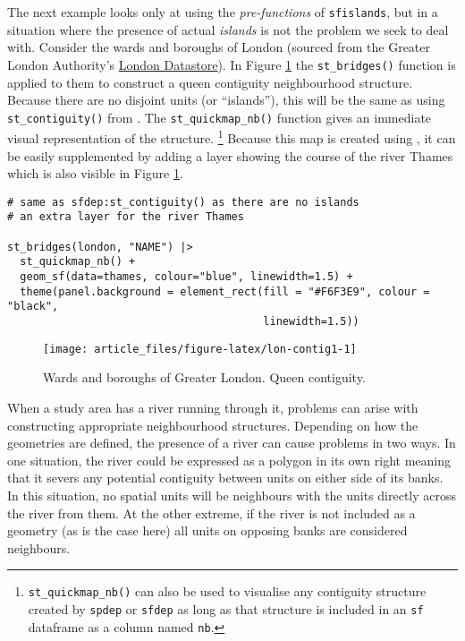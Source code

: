 The next example looks only at using the \emph{pre-functions} of \texttt{sfislands}, but in a situation where the presence of actual \emph{islands} is not the problem we seek to deal with. Consider the wards and boroughs of London (sourced from the Greater London Authority's \href{https://data.london.gov.uk/}{London Datastore}). In Figure \ref{fig:lon-contig1} the \texttt{st\_bridges()}
function is applied to them to construct a queen contiguity
neighbourhood structure. Because there are no disjoint units (or
``islands''), this will be the same as using \texttt{st\_contiguity()} from
. The \texttt{st\_quickmap\_nb()} function gives an immediate
visual representation of the structure. \footnote{\texttt{st\_quickmap\_nb()} can also be used to visualise any contiguity structure created by \texttt{spdep} or \texttt{sfdep} as long as that structure is included in an \texttt{sf} dataframe as a column named \texttt{nb}.} Because this map is created using , it can be easily supplemented by adding a layer showing the course of the river Thames which is also visible in Figure \ref{fig:lon-contig1}.

\begin{verbatim}
# same as sfdep:st_contiguity() as there are no islands
# an extra layer for the river Thames

st_bridges(london, "NAME") |> 
  st_quickmap_nb() + 
  geom_sf(data=thames, colour="blue", linewidth=1.5) + 
  theme(panel.background = element_rect(fill = "#F6F3E9", colour = "black", 
                                        linewidth=1.5))
\end{verbatim}

\begin{figure}

{\centering \texttt{[image: article\_files/figure-latex/lon-contig1-1]} 

}

\caption{Wards and boroughs of Greater London. Queen contiguity. }\label{fig:lon-contig1}
\end{figure}

When a study area has a river running through it, problems can arise with constructing appropriate neighbourhood structures. Depending on how the
geometries are defined, the presence of a river can cause problems in two ways. In one situation, the river could be expressed as a polygon in its own right meaning that it severs any potential contiguity between units on either side of its banks. In this situation, no spatial units will be neighbours with the units directly across the river from them. At the other extreme, if the river is not included as a geometry (as is the case here) all units on opposing banks are considered neighbours.

